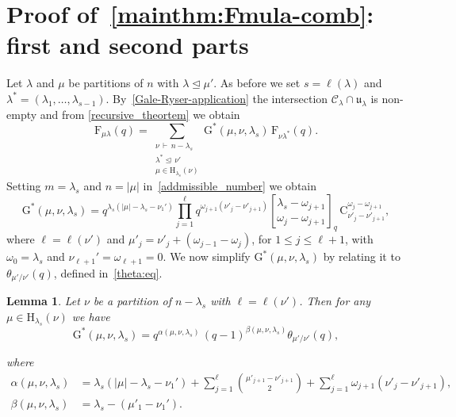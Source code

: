 \documentclass[12pt,a4paper,reqno]{amsart}
\theoremstyle{plain}
\newtheorem{lemma}[theorem]{Lemma}
\theoremstyle{definition}
\newcommand{\less}{\unlhd}
\newcommand{\1}{\mathds{1}}
\newcommand{\C}{\mathcal{C}}
\newcommand{\G}{{\mathrm{G}}}
\newcommand{\F}{\mathrm{F}}
\newcommand{\HH}{\mathrm{H}}
\renewcommand{\u}{\mathfrak{u}}
\begin{document}
\section{Proof of~\cref{mainthm:Fmula-comb}: first and second parts}\label{F-Combin:Section} Let $\lambda$ and $\mu$ be partitions of $n$ with $\lambda\less \mu'$. As before we set $s=\ell(\lambda)$ and $\lambda^*=(\lambda_1,\dots,\lambda_{s-1})$.  By~\cref{Gale-Ryser-application} the intersection $\C_\lambda\cap \u_\lambda$ is non-empty and from  
\cref{recursive_theortem} we obtain 
\begin{equation}\label{rec:F}
\F_{\mu\lambda}(q)=\sum_{\substack{\nu\, \vdash\, n-\lambda_s\\[0.06cm] \lambda^*\less\, \nu' \\[0.06cm] \mu\in \HH_{\lambda_s}(\nu)}} \G^*(\mu,\nu,\lambda_s)\, \F_{\nu\lambda^*}(q).
\end{equation}
Setting $m=\lambda_s$ and $n=|\mu|$ in~\cref{addmissible_number} we obtain
\begin{equation}\label{GC-eq}
\G^*(\mu,\nu,\lambda_s)=q^{\lambda_s(|\mu|-\lambda_s-\nu_1')}\prod_{j=1}^{\ell}q^{\omega_{j+1}(\nu'_j-\nu'_{j+1})}{\lambda_s-\omega_{j+1}\brack \omega_{j}-\omega_{j+1}}_q\,\mathrm{C}^{\omega_j-\omega_{j+1}}_{\nu'_j-\nu'_{j+1}},
\end{equation}
where $\ell = \ell(\nu')$ and $\mu'_j = \nu'_j + (\omega_{j-1} - \omega_j)$, for $1 \leq j \leq \ell+1$, with $\omega_0 = \lambda_s$ and $\nu_{\ell+1}'=\omega_{\ell+1} = 0$.
We now simplify $\G^*(\mu,\nu,\lambda_s)$ by relating it to $\theta_{\mu'/\nu'}(q)$, defined in~\cref{theta:eq}. 
\begin{lemma}\label{G:Simplification} Let $\nu$ be a partition of $n-\lambda_s$ with $\ell=\ell(\nu')$. Then for any $\mu\in\HH_{\lambda_s}(\nu)$ we have
$$
\G^*(\mu,\nu,\lambda_s)=q^{\alpha(\mu,\nu,\lambda_s)}\, (q-1)^{\beta(\mu,\nu,\lambda_s)}
\theta_{\mu'/\nu'}(q),
$$



where 
\begin{equation}\label{alpha-beta}
\begin{split}
\alpha(\mu,\nu,\lambda_s)&=\lambda_s(|\mu|-\lambda_s-\nu_1')+\sum_{j=1}^\ell \binom{\mu'_{j+1}-\nu'_{j+1}}{2}+\sum_{j=1}^\ell \omega_{j+1}(\nu'_j-\nu'_{j+1}),
\\
\beta(\mu,\nu,\lambda_s)&=\lambda_s-(\mu'_1-\nu_1').
\end{split}
\end{equation}
\end{lemma}
\end{document}
